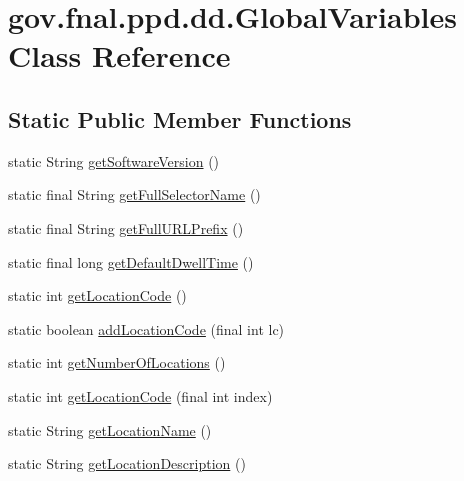 \hypertarget{classgov_1_1fnal_1_1ppd_1_1dd_1_1GlobalVariables}{\section{gov.\-fnal.\-ppd.\-dd.\-Global\-Variables Class Reference}
\label{classgov_1_1fnal_1_1ppd_1_1dd_1_1GlobalVariables}
}
\subsection*{Static Public Member Functions}
\begin{DoxyCompactItemize}
\item 
static String \hyperlink{classgov_1_1fnal_1_1ppd_1_1dd_1_1GlobalVariables_a7ad73efb183068d334b1977c3ef799cc}{get\-Software\-Version} ()
\item 
static final String \hyperlink{classgov_1_1fnal_1_1ppd_1_1dd_1_1GlobalVariables_ae88e0336fe6e23f56d14aee1882b88d4}{get\-Full\-Selector\-Name} ()
\item 
static final String \hyperlink{classgov_1_1fnal_1_1ppd_1_1dd_1_1GlobalVariables_ab7639ebfcc296b374593079a06026c65}{get\-Full\-U\-R\-L\-Prefix} ()
\item 
static final long \hyperlink{classgov_1_1fnal_1_1ppd_1_1dd_1_1GlobalVariables_aedef0ba63ced272b0ec2f17504a2cf96}{get\-Default\-Dwell\-Time} ()
\item 
static int \hyperlink{classgov_1_1fnal_1_1ppd_1_1dd_1_1GlobalVariables_a9628de1e1de48d98cda0cc110f0c1b92}{get\-Location\-Code} ()
\item 
static boolean \hyperlink{classgov_1_1fnal_1_1ppd_1_1dd_1_1GlobalVariables_a17d26da1f2cffe32553babb71545319e}{add\-Location\-Code} (final int lc)
\item 
static int \hyperlink{classgov_1_1fnal_1_1ppd_1_1dd_1_1GlobalVariables_af9305013fcd1f485a77e6448b5b14ebb}{get\-Number\-Of\-Locations} ()
\item 
static int \hyperlink{classgov_1_1fnal_1_1ppd_1_1dd_1_1GlobalVariables_afa655a7918baebe5606c9a936f25a2b5}{get\-Location\-Code} (final int index)
\item 
static String \hyperlink{classgov_1_1fnal_1_1ppd_1_1dd_1_1GlobalVariables_a2b6eb3cd0162c4ef8a7476afc3180602}{get\-Location\-Name} ()
\item 
static String \hyperlink{classgov_1_1fnal_1_1ppd_1_1dd_1_1GlobalVariables_a0dd398dcbd954f1d5c9060a40567cde8}{get\-Location\-Description} ()
\item 

\end{DoxyCompactItemize}
